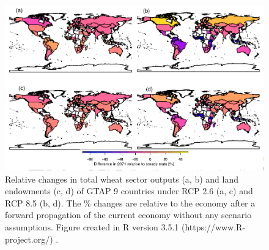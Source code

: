 \documentclass[titlesmallcaps,copyrightpage]{uomthesis}\usepackage[]{graphicx}\usepackage[]{color}
\begin{document}
\begin{figure}[htb]
  \centering
  \includegraphics[width=\textwidth]{chapters/figures/chapter2/supfig2.pdf}
  \caption{Relative changes in total wheat sector outputs (a, b) and land endowments (c, d) of GTAP 9 countries under RCP 2.6 (a, c) and RCP 8.5 (b, d). The \% changes are relative to the economy after a forward propagation of the current economy without any scenario assumptions. Figure created in R version 3.5.1 (https://www.R-project.org/) \citep{r_development_core_team_r_2008}.}
  \label{apx:ch2:fig2}
\end{figure}
\end{document}
